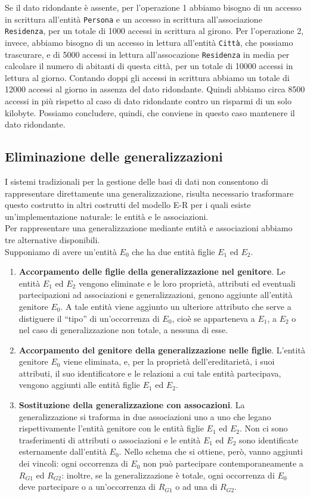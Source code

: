 \documentclass[12pt]{report}
\begin{document}
	Se il dato ridondante è assente, per l'operazione 1 abbiamo bisogno di un accesso in scrittura all'entità \texttt{Persona} e un accesso in scrittura all'associazione \texttt{Residenza}, per un totale di 1000 accessi in scrittura al girono. Per l'operazione 2, invece, abbiamo bisogno di un accesso in lettura all'entità \texttt{Città}, che possiamo trascurare, e di 5000 accessi in lettura all'assocazione \texttt{Residenza} in media per calcolare il numero di abitanti di questa città, per un totale di 10000 accessi in lettura al giorno. Contando doppi gli accessi in scrittura abbiamo un totale di 12000 accessi al giorno in assenza del dato ridondante. Quindi abbiamo circa 8500 accessi in più rispetto al caso di dato ridondante contro un risparmi di un solo kilobyte. Possiamo concludere, quindi, che conviene in questo caso mantenere il dato ridondante.
	\subsection{Eliminazione delle generalizzazioni}
		I sistemi tradizionali per la gestione delle basi di dati non consentono di rappresentare direttamente una generalizzazione, risulta necessario trasformare questo costrutto in altri costrutti del modello E-R per i quali esiste un'implementazione naturale: le entità e le associazioni.  \\
		Per rappresentare una generalizzazione mediante entità e associazioni abbiamo tre alternative disponibili. \\
		Supponiamo di avere un'entità $E_0$ che ha due entità figlie $E_1$ ed $E_2$.
		\begin{enumerate}
			\item \textbf{Accorpamento delle figlie della generalizzazione nel genitore}. Le entità $E_1$ ed $E_2$ vengono eliminate e le loro proprietà, attributi ed eventuali partecipazioni ad associazioni e generalizzazioni, genono aggiunte all'entità genitore $E_0$. A tale entità viene aggiunto un ulteriore attributo che serve a distiguere il ``tipo'' di un'occorrenza di $E_0$, cioè se apparteneva a $E_1$, a $E_2$ o nel caso di generalizzazione non totale, a nessuna di esse.
			\item \textbf{Accorpamento del genitore della generalizzazione nelle figlie}. L'entità genitore $E_0$ viene eliminata, e, per la proprietà dell'ereditarietà, i suoi attributi, il suo identificatore e le relazioni a cui tale entità partecipava, vengono aggiunti alle entità figlie $E_1$ ed $E_2$.
			\item \textbf{Sostituzione della generalizzazione con assocazioni}. La generalizzazione si traforma in due associazioni uno a uno che legano rispettivamente l'entità genitore con le entità figlie $E_1$ ed $E_2$. Non ci sono trasferimenti di attributi o associazioni e le entità $E_1$ ed $E_2$ sono identificate esternamente dall'entità $E_0$. Nello schema che si ottiene, però, vanno aggiunti dei vincoli: ogni occorrenza di $E_0$ non può partecipare contemporaneamente a $R_{G1}$ ed $R_{G2}$: inoltre, se la generalizzazione è totale, ogni occorrenza di $E_0$ deve partecipare o a un'occorrenza di $R_{G1}$ o ad una di $R_{G2}$.
		\end{enumerate}
\end{document}
